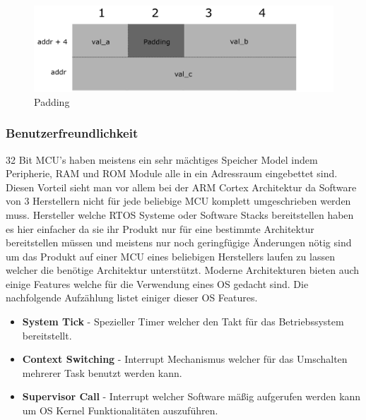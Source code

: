 \documentclass[MES,Master,ngerman]{twbook}%
\begin{document}
\begin{figure}[!htb]
	\centering
	\begin{subfigure}[b]{0.5\textwidth}
		
		\label{lst:01}
	\end{subfigure}
\end{figure}

\begin{figure}[h]
	\centering
	\includegraphics[scale=1.3]{../Grafiken/padding.png}
	\caption{Padding}
	\label{fig:32}
\end{figure}




\subsubsection{Benutzerfreundlichkeit}
32 Bit MCU's haben meistens ein sehr mächtiges Speicher Model indem Peripherie, RAM und ROM Module alle in ein Adressraum eingebettet sind. Diesen Vorteil sieht man vor allem bei der ARM Cortex Architektur da Software von 3 Herstellern nicht für jede beliebige MCU komplett umgeschrieben werden muss. Hersteller welche RTOS Systeme oder Software Stacks bereitstellen haben es hier einfacher da sie ihr Produkt nur für eine bestimmte Architektur bereitstellen müssen und meistens nur noch geringfügige Änderungen nötig sind um das Produkt auf einer MCU eines beliebigen Herstellers laufen zu lassen welcher die benötige Architektur unterstützt. Moderne Architekturen bieten auch einige Features welche für die Verwendung eines OS gedacht sind. Die nachfolgende Aufzählung listet einiger dieser OS Features. 

\begin{itemize}
	\item \textbf{System Tick} - Spezieller Timer welcher den Takt für das Betriebssystem bereitstellt.
	\item \textbf{Context Switching} - Interrupt Mechanismus welcher für das Umschalten mehrerer Task benutzt werden kann.
	\item \textbf{Supervisor Call} - Interrupt welcher Software mäßig aufgerufen werden kann um OS Kernel Funktionalitäten auszuführen.
\end{itemize}
\end{document}
